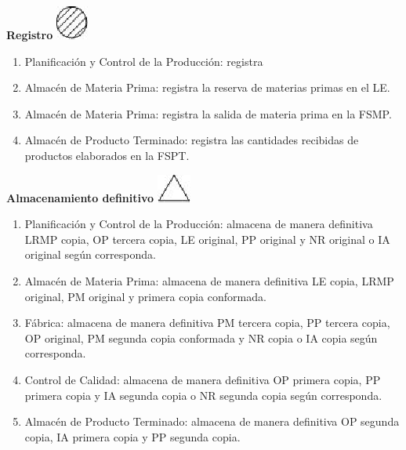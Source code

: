 \begin{center}
  \textbf{Registro}
  \includegraphics{./Images/Simbolos/simbolo-Registro.png}
\end{center}
\begin{enumerate}
  \item Planificaci\'on y Control de la Producci\'on: registra
  \item Almac\'en de Materia Prima: registra la reserva de materias primas en el LE.
  \item Almac\'en de Materia Prima: registra la salida de materia prima en la FSMP.
  \item Almac\'en de Producto Terminado: registra las cantidades recibidas de productos elaborados en la FSPT.
\end{enumerate}

\begin{center}
  \textbf{Almacenamiento definitivo}
  \includegraphics{./Images/Simbolos/simbolo-Almacenamiento-Definitivo.png}
\end{center}
\begin{enumerate}
  \item Planificaci\'on y Control de la Producci\'on: almacena de manera definitiva LRMP copia, OP tercera copia, LE original, PP original y NR original o IA original seg\'un corresponda.
  \item Almac\'en de Materia Prima: almacena de manera definitiva LE copia, LRMP original, PM original y primera copia conformada. 
  \item F\'abrica: almacena de manera definitiva PM tercera copia, PP tercera copia, OP original, PM segunda copia conformada y NR copia o IA copia seg\'un corresponda.
  \item Control de Calidad: almacena de manera definitiva OP primera copia, PP primera copia y IA segunda copia o NR segunda copia seg\'un corresponda.
  \item Almac\'en de Producto Terminado: almacena de manera definitiva OP segunda copia, IA primera copia y PP segunda copia.
\end{enumerate}

